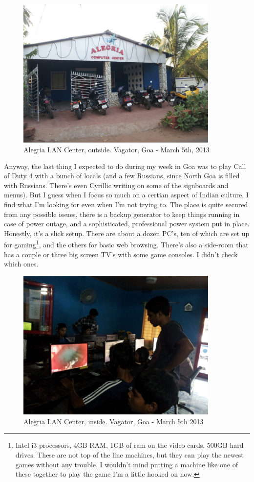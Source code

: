 \documentclass[11pt]{amsart}
\begin{document}
\begin{figure}[ht!]
\center
\includegraphics[width=100mm]{alegria_outside.jpg}
\caption{Alegria LAN Center, outside. Vagator, Goa - March 5th, 2013}
\end{figure}

Anyway, the last thing I expected to do during my week in Goa was to play Call of Duty 4 with a bunch of locals (and a few Russians, since North Goa is filled with Russians. There's even Cyrillic writing on some of the signboards and menus). But I guess when I focus so much on a certian aspect of Indian culture, I find what I'm looking for even when I'm not trying to. The place is quite secured from any possible issues, there is a backup generator to keep things running in case of power outage, and a sophisticated, professional power system put in place. Honestly, it's a slick setup. There are about a dozen PC's, ten of which are set up for gaming\footnote{Intel i3 processors, 4GB RAM, 1GB of ram on the video cards, 500GB hard drives. These are not top of the line machines, but they can play the newest games without any trouble. I wouldn't mind putting a machine like one of these together to play the game I'm a little hooked on now.}, and the others for basic web browsing. There's also a side-room that has a couple or three big screen TV's with some game consoles. I didn't check which ones.

\begin{figure}[ht!]
\center
\includegraphics[width=100mm]{alegria_inside.jpg}
\caption{Alegria LAN Center, inside. Vagator, Goa - March 5th 2013}
\end{figure}
\end{document}
